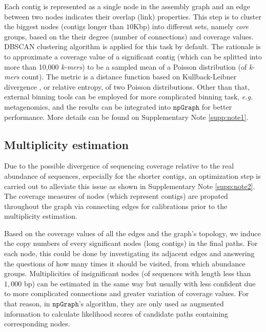 \documentclass[10pt,twocolumn,twoside]{genpaper}
\newcommand{\npgraph}{$\mathtt{npGraph}$}
\newcommand{\EG}{\emph{e.g.}}
\begin{document}
Each contig is represented as a single node in the assembly graph and an edge between two nodes indicates their overlap (link) properties.
This step is to cluster the biggest nodes (contigs longer than $10$Kbp) into different sets, namely \emph{core} groups, based on the their degree (number of connections) and coverage values.
DBSCAN clustering algorithm \cite{Ester96adensity-based} is applied for this task by default.
The rationale is to approximate a coverage value of a significant contig (which can be splitted into more than 10,000 \emph{k-mers}) to be a sampled mean of a Poisson distribution (of \emph{k-mers} count). 
The metric is a distance function based on Kullback-Leibner divergence \cite{Kullback1951information}, or relative entropy, of two Poisson distributions. Other than that, external binning tools can be employed for more complicated binning task, \EG{} metagenomics, and the results can be integrated into \npgraph{} for better performance. More details can be found on Supplementary Note \ref{supp:note1}.

\subsection*{Multiplicity estimation}
Due to the possible divergence of sequencing coverage relative to the real abundance of sequences, especially for the shorter contigs, an optimization step is carried out to alleviate this issue as shown in Supplementary Note \ref{supp:note2}. The coverage measures of nodes (which represent contigs) are propated throughout the graph via connecting edges for calibrations prior to the multiplicity estimation. 

Based on the coverage values of all the edges and the graph's topology, we induce the copy numbers of every significant nodes (long contigs) in the final paths.
For each node, this could be done by investigating its adjacent edges and answering the questions of how many times it should be visited, from which abundance groups.
Multiplicities of insignificant nodes (of sequences with length less than $1,000$ bp) can be estimated in the same way but usually with less confident due to more complicated connections and greater variation of coverage values. 
For that reason, in \npgraph{}'s algorithm, they are only used as augmented information to calculate likelihood scores of candidate paths containing corresponding nodes.

\end{document}
